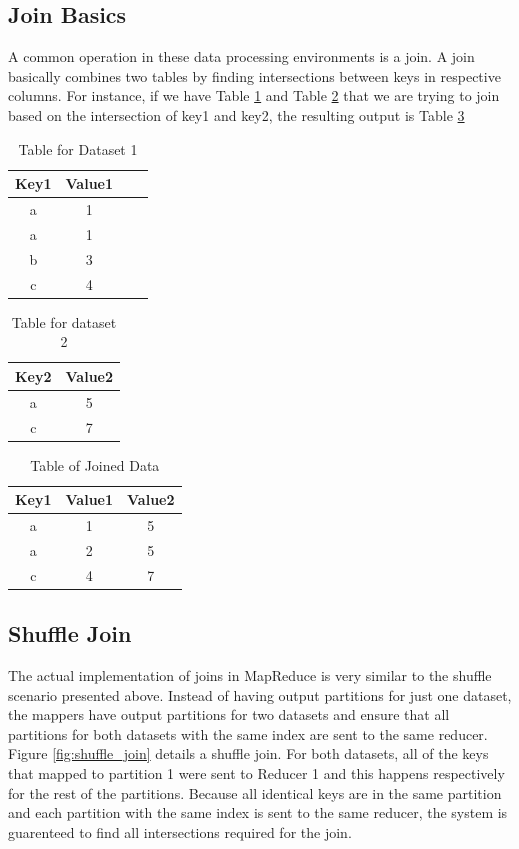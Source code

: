 \subsection{Join Basics}

A common operation in these data processing environments is a join.
A join basically combines two tables by finding intersections between
keys in respective columns. For instance, if we have   
Table \ref{table:join1} and Table \ref{table:join2} that we are trying to join based on the intersection
of key1 and key2, the resulting output is Table \ref{table:join3}   
\begin{table}[h!]
\centering
 \begin{tabular}{|c |c |c |c|}
  \hline
   Key1 & Value1 \\
  \hline
   a & 1 \\
  \hline
   a & 1 \\
  \hline
   b & 3 \\
  \hline
   c & 4 \\
  \hline
\end{tabular}
\caption{Table for Dataset 1}
\label{table:join1}
\end{table}

\begin{table}[h!]
\centering
 \begin{tabular}{|c |c|}
  \hline
   Key2 & Value2 \\
  \hline
   a & 5 \\
  \hline
   c & 7 \\
  \hline
\end{tabular}
\caption{Table for dataset 2}
\label{table:join2}
\end{table}

\begin{table}[h!]
\centering
 \begin{tabular}{|c |c |c|}
  \hline
   Key1 & Value1 & Value2  \\
  \hline
   a & 1 & 5 \\
  \hline
   a & 2 & 5 \\
  \hline
   c & 4 & 7 \\
  \hline
\end{tabular}
\caption{Table of Joined Data}
\label{table:join3}
\end{table}

\subsection{Shuffle Join}
The actual implementation of joins in MapReduce is very similar to the
shuffle scenario presented above. Instead of having output partitions for just one dataset,
the mappers have output partitions for two datasets and ensure that all partitions for both datasets with the same index 
are sent to the same reducer.  
Figure \ref{fig:shuffle_join} details a shuffle join.
For both datasets, all of the keys that 
mapped to partition 1 were sent to Reducer 1 and this happens respectively for the rest of the partitions. Because
all identical keys are in the same partition and each partition with the same index is sent to the same reducer,
the system is guarenteed to find all intersections required for the join.

